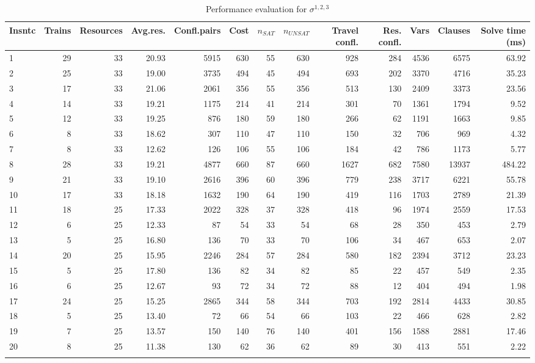 
 \begin{landscape}
    \begin{longtable}[]{@{}lrrrrrrrrrrrr@{}}
    Insntc & Trains & Resources & Avg.res. & Confl.pairs & Cost & $n_{SAT}$ & $n_{UNSAT}$ & Travel confl. & Res. confl. & Vars & Clauses & Solve time (ms) \tabularnewline
    \midrule
    \endhead
    1&29&33&20.93&5915&630&55&630&928&284&4536&6575&63.92 \\
    2&25&33&19.00&3735&494&45&494&693&202&3370&4716&35.23 \\
    3&17&33&21.06&2061&356&55&356&513&130&2409&3373&23.56 \\
    4&14&33&19.21&1175&214&41&214&301&70&1361&1794&9.52 \\
    5&12&33&19.25&876&180&59&180&266&62&1191&1663&9.85 \\
    6&8&33&18.62&307&110&47&110&150&32&706&969&4.32 \\
    7&8&33&12.62&126&106&55&106&184&42&786&1173&5.77 \\
    8&28&33&19.21&4877&660&87&660&1627&682&7580&13937&484.22 \\
    9&21&33&19.10&2616&396&60&396&779&238&3717&6221&55.78 \\
    10&17&33&18.18&1632&190&64&190&419&116&1703&2789&21.39 \\
    11&18&25&17.33&2022&328&37&328&418&96&1974&2559&17.53 \\
    12&6&25&12.33&87&54&33&54&68&28&350&453&2.79 \\
    13&5&25&16.80&136&70&33&70&106&34&467&653&2.07 \\
    14&20&25&15.95&2246&284&57&284&580&182&2394&3712&23.23 \\
    15&5&25&17.80&136&82&34&82&85&22&457&549&2.35 \\
    16&6&25&12.67&93&72&34&72&88&12&404&494&1.98 \\
    17&24&25&15.25&2865&344&58&344&703&192&2814&4433&30.85 \\
    18&5&25&13.40&72&66&54&66&103&22&466&628&2.82 \\
    19&7&25&13.57&150&140&76&140&401&156&1588&2881&17.46 \\
    20&8&25&11.38&130&62&36&62&89&30&413&551&2.22 \\
    \caption{Performance evaluation for \Large{$\sigma^{1,2,3}$}}
    \end{longtable}
     \end{landscape}

